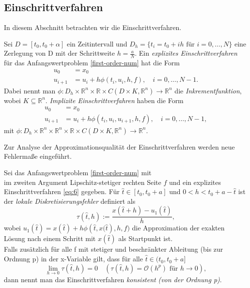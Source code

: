 \subsection{Einschrittverfahren}
In diesem Abschnitt betrachten wir die Einschrittverfahren.
\begin{definition}
    Sei $D=[t_0,t_0+\alpha]$ ein Zeitintervall und
    $D_h=\{t_i=t_0 + ih \text{ für } i=0, \dots,N\}$ eine Zerlegung von D mit der Schrittweite $h=\frac{a}{N}$.
    Ein {\em explizites Einschrittverfahren} für das Anfangswertproblem \eqref{first-order-num} hat die Form
    \begin{align}
        u_0 &= x_0 \nonumber \\
        u_{i+1} &= u_i + h \phi(t_i,u_i,h,f), \quad i=0,\dots,N-1. \label{eq:6}
    \end{align}
    Dabei nennt man
    $\phi:D_h \times \mathbb{R}^n \times \mathbb{R} \times C(D \times K,\mathbb{R}^n) \rightarrow \mathbb{R}^n$ die
    {\em Inkrementfunktion}, wobei $K \subseteq \mathbb{R}^n$.
    {\em Implizite Einschrittverfahren} haben die Form
    \begin{align*}
        u_0 &= x_0\\
        u_{i+1} &= u_i + h\phi(t_i,u_i,u_{i+1},h,f), \quad i=0,\dots,N-1,
    \end{align*}
    mit $\phi:D_h \times \mathbb{R}^n \times \mathbb{R}^n \times \mathbb{R} \times C(D \times K,\mathbb{R}^n)
    \rightarrow \mathbb{R}^n$.
\end{definition}
Zur Analyse der Approximationsqualität der Einschrittverfahren werden neue Fehlermaße eingeführt.
\begin{definition}
    Sei das Anfangswertproblem \eqref{first-order-num} mit \\ im zweiten Argument Lipschitz-stetiger
    rechten Seite $f$ und ein explizites Einschrittverfahren \eqref{eq:6} gegeben.
    Für $\hat{t}\in [t_0,t_0+a]$ und $0 < h < t_0 + a - \hat{t}$ ist der {\em lokale Diskretisierungsfehler} definiert als
    \[
        \tau(\hat{t}, h) := \frac{x(\hat{t} + h) - u_1(\hat{t})}{h},
    \] wobei $u_1(\hat{t})=x(\hat{t}) + h\phi\left(\hat{t},x(\hat{t}\right),h,f) $ die Approximation der exakten
    Lösung nach einem Schritt mit $x(\hat{t})$ als Startpunkt ist.\\
    Falls zusätzlich für alle f mit stetiger und beschränkter Ableitung (bis zur Ordnung p) in der x-Variable gilt, dass
    für alle $\hat{t} \in (t_0, t_0+a]$
    \[
        \lim_{h \rightarrow 0 } \tau(\hat{t}, h)=0 \quad (\tau(\hat{t},h) = \mathcal{O}(h^p) \text{ für } h \rightarrow 0),
    \] dann nennt man das Einschrittverfahren {\em konsistent} {\em (von der Ordnung p)}.
\end{definition}
